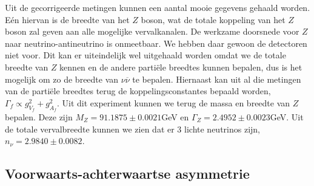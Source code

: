 \documentclass[../main.tex]{subfiles}
\begin{document}
Uit de gecorrigeerde metingen kunnen een aantal mooie gegevens gehaald worden. Eén hiervan is de breedte van het $Z$ boson, wat de totale koppeling van het $Z$ boson zal geven aan alle mogelijke vervalkanalen. De werkzame doorsnede voor $Z$ naar neutrino-antineutrino is onmeetbaar. We hebben daar gewoon de detectoren niet voor. Dit kan er uiteindelijk wel uitgehaald worden omdat we de totale breedte van $Z$ kennen en de andere partiële breedtes kunnen bepalen, dus is het mogelijk om zo de breedte van $\nu\overline \nu$ te bepalen. Hiernaast kan uit al die metingen van de partiële breedtes terug de koppelingsconstantes bepaald worden, $\Gamma_f \propto g_{V_f}^2+g_{A_f}^2$. Uit dit experiment kunnen we terug de massa en breedte van $Z$ bepalen. Deze zijn $M_Z = 91.1875 \pm 0.0021$GeV en $\Gamma_Z = 2.4952 \pm 0.0023$GeV. Uit de totale vervalbreedte kunnen we zien dat er 3 lichte neutrinos zijn, $n_\nu = 2.9840 \pm 0.0082$.

\subsection{Voorwaarts-achterwaartse asymmetrie}%
\label{sub:voorwaards_achterwaardse_asymmetrie}
\end{document}
